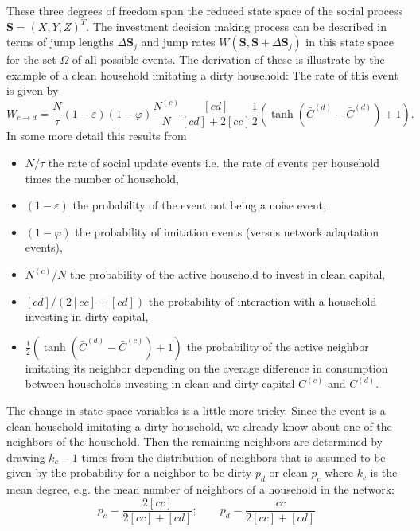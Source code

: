 These three degrees of freedom span the reduced state space of the social process $\mathbf{S} = (X, Y, Z)^T$. The investment decision making process can be described in terms of jump lengths $\Delta \mathbf{S}_j$ and jump rates $W(\mathbf{S},\mathbf{S} + \Delta \mathbf{S}_j)$ in this state space for the set $\Omega$ of all possible events.
The derivation of these is illustrate by the example of a clean household imitating a dirty household: The rate of this event is given by
\begin{equation}
	W_{c \rightarrow d} = \frac{N}{\tau} (1-\varepsilon) (1 - \varphi) \frac{N^{(c)}}{N}\frac{[cd]}{[cd] + 2 [cc]}\frac{1}{2}\left( \tanh(\bar{C}^{(d)} - \bar{C}^{(d)}) + 1 \right).
	\label{cdswitchingprob}
\end{equation}
In some more detail this results from
\begin{itemize}
	\item $N/\tau$ the rate of social update events i.e. the rate of events per household times the number of household,
	\item $(1-\varepsilon)$ the probability of the event not being a noise event,
	\item $(1-\varphi)$ the probability of imitation events (versus network adaptation events),
	\item $N^{(c)}/N$ the probability of the active household to invest in clean capital,
	\item $[cd]/(2[cc] + [cd])$ the probability of interaction with a household investing in dirty capital,
	\item $\frac{1}{2}\left( \tanh(\bar{C}^{(d)} - \bar{C}^{(c)}) + 1 \right)$ the probability of the active neighbor imitating its neighbor depending on the average difference in consumption between households investing in clean and dirty capital $C^{(c)}$ and $C^{(d)}$.
\end{itemize}
The change in state space variables is a little more tricky. Since the event is a clean household imitating a dirty household, we already know about one of the neighbors of the household. Then the remaining neighbors are determined by drawing $k_c - 1$ times from the distribution of neighbors that is assumed to be given by the probability for a neighbor to be dirty $p_d$ or clean $p_c$ where $k_c$ is the mean degree, e.g. the mean number of neighbors of a household in the network:
\begin{equation}
	p_c = \frac{2 [cc]}{2[cc] + [cd]}; \qquad p_d = \frac{cc}{2[cc] + [cd]}
	\label{neighbordist}
\end{equation}
